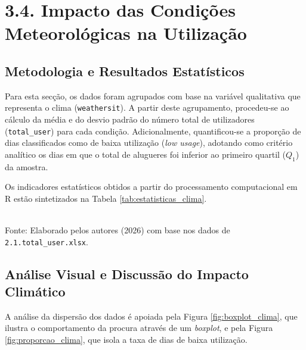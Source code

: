 \documentclass[12pt, a4paper]{article}
\begin{document}
\section*{3.4. Impacto das Condições Meteorológicas na Utilização}

\subsection*{Metodologia e Resultados Estatísticos}
Para esta secção, os dados foram agrupados com base na variável qualitativa que representa o clima (\texttt{weathersit}). A partir deste agrupamento, procedeu-se ao cálculo da média e do desvio padrão do número total de utilizadores (\texttt{total\_user}) para cada condição. Adicionalmente, quantificou-se a proporção de dias classificados como de baixa utilização (\textit{low usage}), adotando como critério analítico os dias em que o total de alugueres foi inferior ao primeiro quartil ($Q_1$) da amostra.

Os indicadores estatísticos obtidos a partir do processamento computacional em R estão sintetizados na Tabela \ref{tab:estatisticas_clima}.

\begin{table}[H]
    \centering
    \caption{Estatísticas de utilização por condição meteorológica.}
    \vspace{0.1cm}
    \\ \vspace{0.1cm}
    \footnotesize{Fonte: Elaborado pelos autores (2026) com base nos dados de \texttt{2.1.total\_user.xlsx}.}
    \label{tab:estatisticas_clima}
\end{table}

\subsection*{Análise Visual e Discussão do Impacto Climático}
A análise da dispersão dos dados é apoiada pela Figura \ref{fig:boxplot_clima}, que ilustra o comportamento da procura através de um \textit{boxplot}, e pela Figura \ref{fig:proporcao_clima}, que isola a taxa de dias de baixa utilização.
\end{document}
